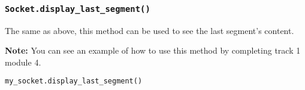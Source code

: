 \documentclass[11pt]{article}
\begin{document}
\subsubsection{\texttt{Socket.\textbf{display\_last\_segment()}}}
The same as above, this method can be used to see the last segment's content.

\textbf{Note:}
You can see an example of how to use this method by completing track 1 module 4.

\begin{lstlisting}[caption={Example for using \texttt{display\_last\_segment()}}, language=Python]
my_socket.display_last_segment()
\end{lstlisting}
\end{document}
